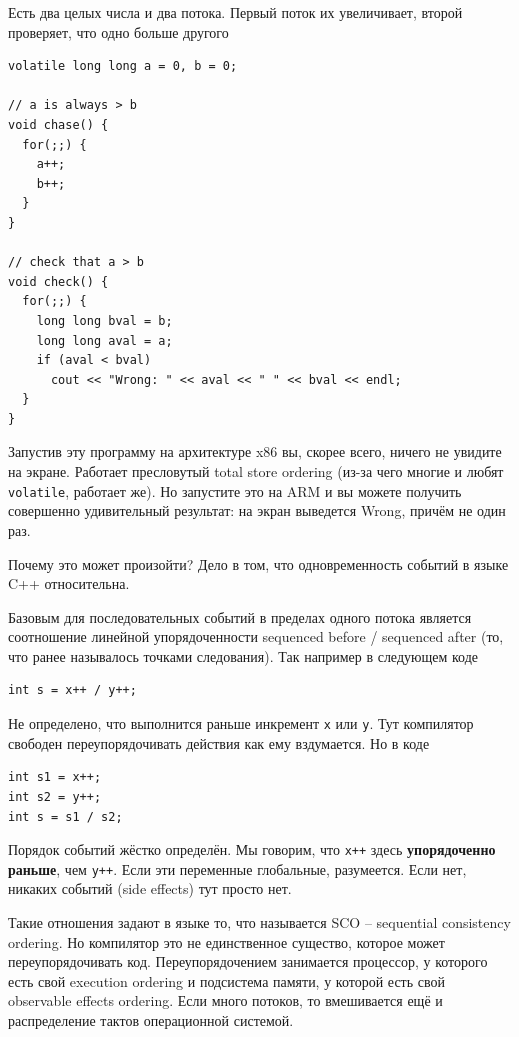 \documentclass[a4paper,12pt,oneside]{book}
\begin{document}
Есть два целых числа и два потока. Первый поток их увеличивает, второй проверяет, что одно больше другого

\begin{lstlisting}
volatile long long a = 0, b = 0;

// a is always > b
void chase() {
  for(;;) {
    a++;
    b++;
  }
}

// check that a > b
void check() {
  for(;;) {
    long long bval = b;
    long long aval = a;
    if (aval < bval)
      cout << "Wrong: " << aval << " " << bval << endl;
  }
}
\end{lstlisting}

Запустив эту программу на архитектуре x86 вы, скорее всего, ничего не увидите на экране. Работает пресловутый total store ordering (из-за чего многие и любят \lstinline!volatile!, работает же). Но запустите это на ARM и вы можете получить совершенно удивительный результат: на экран выведется Wrong, причём не один раз.

Почему это может произойти? Дело в том, что одновременность событий в языке C++ относительна.

Базовым для последовательных событий в пределах одного потока является соотношение линейной упорядоченности sequenced before / sequenced after (то, что ранее называлось точками следования). Так например в следующем коде

\begin{lstlisting}
int s = x++ / y++;
\end{lstlisting}

Не определено, что выполнится раньше инкремент \lstinline!x! или \lstinline!y!. Тут компилятор свободен переупорядочивать действия как ему вздумается. Но в коде

\begin{lstlisting}
int s1 = x++;
int s2 = y++;
int s = s1 / s2;
\end{lstlisting}

Порядок событий жёстко определён. Мы говорим, что \lstinline!x++! здесь \textbf{упорядоченно раньше}, чем \lstinline!y++!. Если эти переменные глобальные, разумеется. Если нет, никаких событий (side effects) тут просто нет.

Такие отношения задают в языке то, что называется SCO -- sequential consistency ordering. Но компилятор это не единственное существо, которое может переупорядочивать код. Переупорядочением занимается процессор, у которого есть свой execution ordering и подсистема памяти, у которой есть свой observable effects ordering. Если много потоков, то вмешивается ещё и распределение тактов операционной системой.
\end{document}
